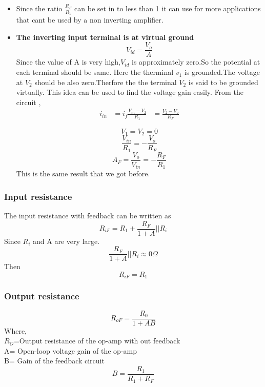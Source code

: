    \begin{note}
   	\begin{itemize}
   		\item 	Since the ratio $\frac{R_F}{R_1}$ can be set in to less than 1 it can use for more applications that cant be used by a non inverting amplifier.
   		\item \textbf{The inverting input terminal is at virtual ground}\\
   		$$V_{id}=\frac{V_o}{A}$$ Since the value of A is very high,$V_{id}$ is approximately zero.So the potential at each terminal should be same. Here the therminal $v_1$ is grounded.The voltage at $V_2$ should be also zero.Therfore the the terminal $V_2$ is said to be grounded virtually.
   		This idea can be used to find the voltage gain easily.
   		From the circuit ,
   		\begin{align*}
   		i_{in}&=i_f
   		\frac{V_{in}-V_2}{R_1}&=\frac{V_2-V_o}{R_F}
   		\end{align*}
   		
   		$$V_1=V_2=0$$
   		$$\frac{V_{in}}{R_1}=-\frac{V_o}{R_F}$$
   		$$A_F=\frac{V_o}{V_{in}}=-\frac{R_F}{R_1}$$
   		This is the same result that we got before.
   	\end{itemize}
   \end{note}
   \subsubsection{Input resistance}
   The input resistance with feedback can be written as \\
   $$R_{iF}=R_1+\frac{R_F}{1+A}\vert\vert R_i$$
   Since $R_i$ and A are very large.\\
   $$\frac{R_F}{1+A}\vert\vert R_i\approx 0\Omega$$
   Then 
   $$R_{iF}=R_1$$
   \subsubsection{Output resistance}
   $$R_{oF}=\frac{R_0}{1+AB}$$
   Where,\\
   $R_O$=Output resistance of the op-amp with out feedback\\
   A= Open-loop voltage gain of the op-amp\\
   B= Gain of the feedback circuit\\
   $$B=\frac{R_1}{R_1+R_F}$$
